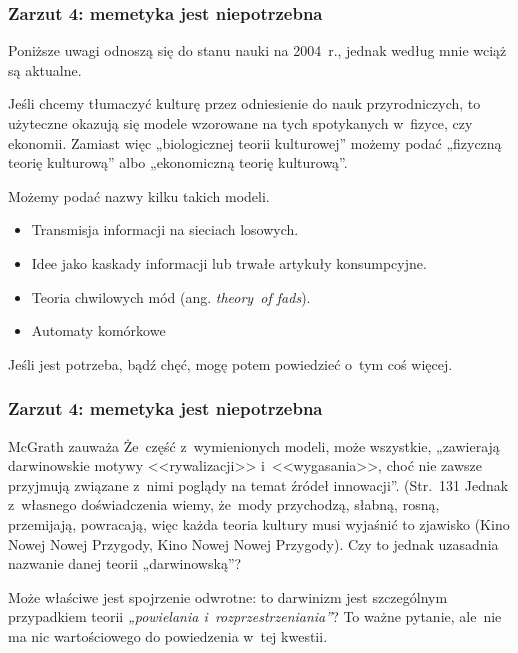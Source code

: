 \documentclass[10pt,t]{beamer}
\begin{document}
\begin{frame}
  \frametitle{Zarzut 4: memetyka jest niepotrzebna}


  Poniższe uwagi odnoszą się do stanu nauki na 2004~r., jednak według mnie
  wciąż są aktualne.

  Jeśli chcemy tłumaczyć kulturę przez odniesienie do nauk przyrodniczych,
  to użyteczne okazują się modele wzorowane na tych spotykanych w~fizyce,
  czy ekonomii. Zamiast więc „biologicznej teorii kulturowej” możemy podać
  „fizyczną teorię kulturową” albo „ekonomiczną teorię kulturową”.

  Możemy podać nazwy kilku takich modeli.
  \begin{itemize}
    \RaggedRight

  \item Transmisja informacji na sieciach losowych.

  \item Idee jako kaskady informacji lub trwałe artykuły
    konsumpcyjne.

  \item Teoria chwilowych mód (ang. \textit{theory~of fads}).

  \item Automaty komórkowe

  \end{itemize}

  Jeśli jest potrzeba, bądź chęć, mogę potem powiedzieć o~tym coś
  więcej.

\end{frame}





\begin{frame}
  \frametitle{Zarzut 4: memetyka jest niepotrzebna}


  McGrath zauważa Że~część z~wymienionych modeli, może wszystkie,
  „zawierają darwinowskie motywy <<rywalizacji>> i~<<wygasania>>, choć
  nie zawsze przyjmują związane z~nimi poglądy na temat źródeł
  innowacji”. (Str.~131 \cite{McGrathBogDawkinsa2008} Jednak z~własnego
  doświadczenia wiemy, że~mody przychodzą, słabną, rosną, przemijają,
  powracają, więc każda teoria kultury musi wyjaśnić to zjawisko (Kino Nowej
  Nowej Przygody, Kino Nowej Nowej Przygody). Czy to jednak uzasadnia
  nazwanie danej teorii „darwinowską”?


  Może właściwe jest spojrzenie odwrotne: to darwinizm jest szczególnym
  przypadkiem teorii \textit{„powielania i~rozprzestrzeniania”}? To ważne
  pytanie, ale~nie ma nic wartościowego do powiedzenia w~tej kwestii.

\end{frame}
\end{document}
